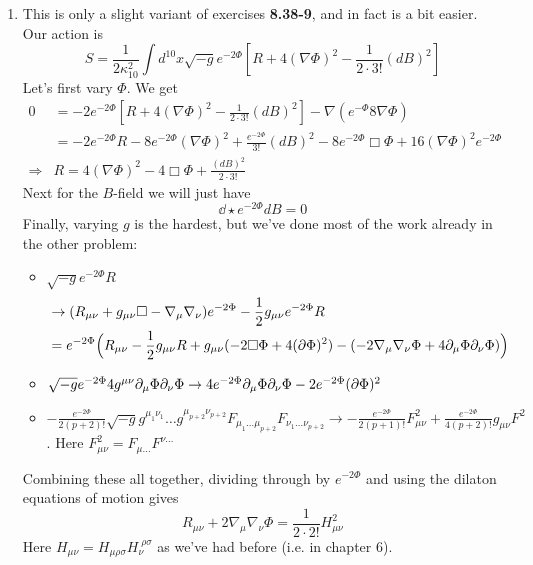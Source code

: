 \documentclass[11pt, class=article, crop=false]{standalone}
\begin{document}
\begin{enumerate}
	\item This is only a slight variant of exercises \textbf{8.38-9}, and in fact is a bit easier. Our action is
	\[
		S = \frac{1}{2 \kappa_{10}^2} \int d^{10} x \sqrt{-g} e^{-2\Phi} \left[R + 4 (\nabla \Phi)^2 - \frac{1}{2 \cdot 3!} (dB)^2 \right]
	\]
	Let's first vary $\Phi$. We get
	\[
	\begin{aligned}
		0 &= - 2 e^{-2 \Phi}  \left[R + 4 (\nabla \Phi)^2 - \frac{1}{2 \cdot 3!} (dB)^2 \right] - \nabla(e^{-\Phi} 8 \nabla \Phi)\\
		&= -2 e^{-2 \Phi} R - 8 e^{-2 \Phi} (\nabla \Phi)^2 + \frac{e^{-2 \Phi}}{3!} (dB)^2 - 8 e^{-2\Phi} \Box \Phi + 16 (\nabla \Phi)^2 e^{-2\Phi}\\
		\Rightarrow & R = 4 (\nabla \Phi)^2 - 4 \Box \Phi + \frac{(dB)^2}{2 \cdot 3!}
	\end{aligned}
	\]
	Next for the $B$-field we will just have
	\[
		\dd \star e^{-2\Phi} dB = 0 
	\]
	Finally, varying $g$ is the hardest, but we've done most of the work already in the other problem:
	\begin{itemize}
		\item $\sqrt{-g} e^{-2\Phi} R$
		 \[
		 \begin{aligned}
		 &\to (R_{\mu \nu} + g_{\mu \nu} \Box - \nabla_\mu \nabla_\nu) e^{-2\Phi}  - \frac12 g_{\mu \nu} e^{-2\Phi} R\\
		 &= e^{-2\Phi} \Big(R_{\mu \nu} - \frac12 g_{\mu \nu} R + g_{\mu \nu} (-2 \Box \Phi + 4 (\partial \Phi)^2) - (-2 \nabla_\mu \nabla_\nu \Phi + 4 \partial_\mu \Phi \partial_\nu \Phi) \Big) 
		 \end{aligned}
		\]
		\item $\sqrt{-g} e^{-2\Phi} 4 g^{\mu \nu} \partial_\mu \Phi \partial_\nu \Phi \to 4 e^{-2\Phi} \partial_\mu \Phi \partial_\nu \Phi - 2 e^{- 2 \Phi} (\partial \Phi)^2$
		\item $- \frac{e^{-2 \Phi}}{2(p+2)!} \sqrt{-g} g^{\mu_1 \nu_1} \dots g^{\mu_{p+2} \nu_{p+2}} F_{\mu_1 \dots \mu_{p+2}} F_{\nu_1 \dots \nu_{p+2}} \to - \frac{e^{-2 \Phi}}{2 (p+1)!} F_{\mu \nu}^2 + \frac{e^{-2 \Phi}}{4(p+2)!} g_{\mu \nu} F^2$. Here $F_{\mu \nu}^2 = F_{\mu \dots} F^{\nu \dots}$
	\end{itemize}
	Combining these all together, dividing through by $e^{-2\Phi}$ and using the dilaton equations of motion gives
	\[
		R_{\mu \nu} + 2 \nabla_\mu \nabla_\nu \Phi = \frac{1}{2 \cdot 2!} H_{\mu \nu}^2
	\]
	Here $H_{\mu \nu} = H_{\mu \rho \sigma} H_{\nu}^{\; \rho \sigma}$ as we've had before (i.e. in chapter 6). 
	

\end{enumerate}
\end{document}
